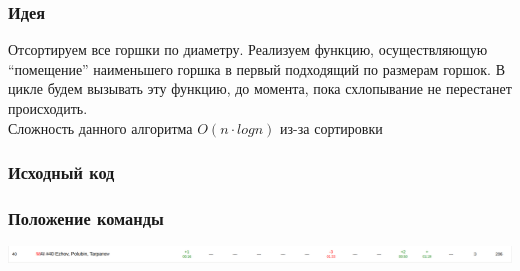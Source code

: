 \documentclass[12pt]{article}
\begin{document}
\subsubsection*{Идея}
Отсортируем все горшки по диаметру. Реализуем функцию, осуществляющую “помещение” наименьшего горшка в первый подходящий по размерам горшок. 
В цикле будем вызывать эту функцию, до момента, пока схлопывание не перестанет происходить.
\\ 
Сложность данного алгоритма $O(n \cdot log{n})$ из-за сортировки
\subsubsection*{Исходный код}

\subsubsection*{Положение команды}
\includegraphics[scale=0.35]{images/6.png}\newline\noindent


\pagebreak
\end{document}
